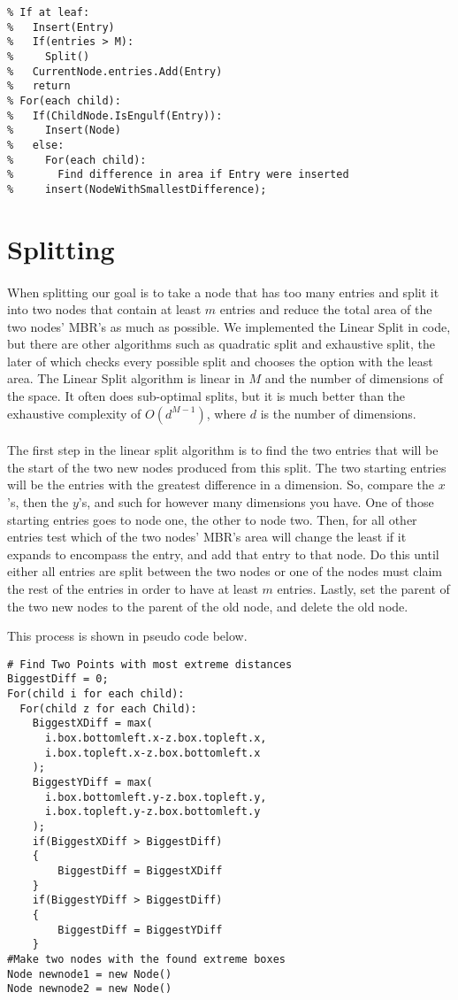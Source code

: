 \documentclass{article}
\begin{document}
\begin{multicols}{2}[]
\begin{lstlisting}
% If at leaf:
%   Insert(Entry)
%   If(entries > M):
%     Split()
%   CurrentNode.entries.Add(Entry)
%   return
% For(each child):
%   If(ChildNode.IsEngulf(Entry)):
%     Insert(Node)
%   else:
%     For(each child):
%       Find difference in area if Entry were inserted
%     insert(NodeWithSmallestDifference);
\end{lstlisting}


\section{Splitting} 

\paragraph{}
When splitting our goal is to take a node that has too many entries and split it into
two nodes that contain at least $m$ entries and reduce the total area of the two nodes'
MBR's as much as possible. We implemented the Linear Split in code, but there are other
algorithms such as quadratic split and exhaustive split, the later of which checks every
possible split and chooses the option with the least area. The Linear Split algorithm
is linear in $M$ and the number of dimensions of the space. It often does sub-optimal
splits, but it is much better than the exhaustive complexity of $O(d^{M-1})$, where
$d$ is the number of dimensions.

\paragraph{}
The first step in the linear split algorithm is to find the two entries that will be the
start of the two new nodes produced from this split. The two starting entries will be the
entries with the greatest difference in a dimension. So, compare the $x$'s, then the $y$'s,
and such for however many dimensions you have. One of those starting entries goes to node one,
the other to node two. Then, for all other entries test which of the two nodes' MBR's area
will change the least if it expands to encompass the entry, and add that entry to that node. Do this
until either all entries are split between the two nodes or one of the nodes must claim the
rest of the entries in order to have at least $m$ entries. Lastly, set the parent of the two
new nodes to the parent of the old node, and delete the old node.

This process is shown in pseudo code below.

\begin{lstlisting}
# Find Two Points with most extreme distances
BiggestDiff = 0;
For(child i for each child):
  For(child z for each Child):
    BiggestXDiff = max(
      i.box.bottomleft.x-z.box.topleft.x,
      i.box.topleft.x-z.box.bottomleft.x
    );
    BiggestYDiff = max(
      i.box.bottomleft.y-z.box.topleft.y,
      i.box.topleft.y-z.box.bottomleft.y
    );
    if(BiggestXDiff > BiggestDiff)
    {
        BiggestDiff = BiggestXDiff
    }
    if(BiggestYDiff > BiggestDiff)
    {
        BiggestDiff = BiggestYDiff
    }
#Make two nodes with the found extreme boxes
Node newnode1 = new Node()
Node newnode2 = new Node()


\end{lstlisting}
\end{multicols}
\end{document}
